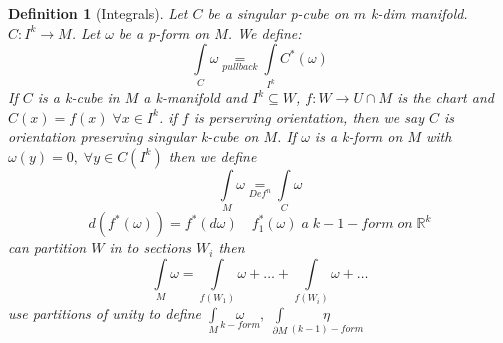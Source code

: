 \documentclass[11pt]{article}
\def\RR{\mathbb{R}}
\newtheorem{definition}{Definition}[section]
\begin{document}
\begin{definition}[Integrals]
Let $C$ be a singular p-cube on $m$ k-dim manifold. $C:I^k \rightarrow M$. Let $\omega$ be a p-form on $M$. We define:
\[\int\limits_{C} \omega \underset{pullback}{=} \int\limits_{I^k} C^*(\omega)\]
If $C$ is a k-cube in $M$ a k-manifold and $I^k \subseteq W$, $f:W\rightarrow U\cap M$ is the chart and $C(x) = f(x) \; \forall x \in I^k$. if $f$ is perserving orientation, then we say $C$ is orientation preserving singular k-cube on $M$. If $\omega$ is a k-form on $M$ with $\omega(y)=0, \; \forall y \in C(I^k)$ then we define 
\[\int\limits_{M} \omega \underset{Def^n}{=} \int\limits_{C} \omega\]
\[\boxed{d(f^*(\omega)) = f^*(d\omega) \quad f_1^*(\omega) \; a \;k-1-form \; on \; \RR^k}\]
can partition $W$ in to sections $W_i$ then 
\[\int\limits_{M} \omega = \int\limits_{f(W_1)} \omega + \dots + \int\limits_{f(W_i)} \omega + \dots\]
use partitions of unity to define $\int\limits_{M} \underset{k-form}{\omega}, \; \int\limits_{\partial M} \underset{(k-1)-form}{\eta}$
\end{definition}
\end{document}
